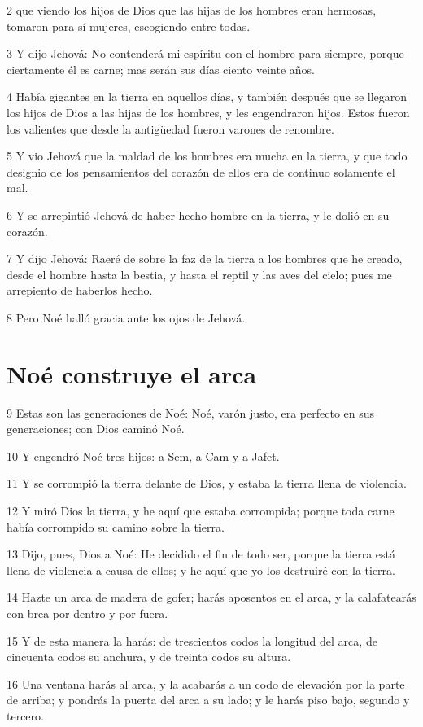2 que viendo los hijos de Dios que las hijas de los hombres eran hermosas, tomaron para sí mujeres, escogiendo entre todas.

3 Y dijo Jehová: No contenderá mi espíritu con el hombre para siempre, porque ciertamente él es carne; mas serán sus días ciento veinte años.

4 Había gigantes en la tierra en aquellos días, y también después que se llegaron los hijos de Dios a las hijas de los hombres, y les engendraron hijos. Estos fueron los valientes que desde la antigüedad fueron varones de renombre.

5 Y vio Jehová que la maldad de los hombres era mucha en la tierra, y que todo designio de los pensamientos del corazón de ellos era de continuo solamente el mal.

6 Y se arrepintió Jehová de haber hecho hombre en la tierra, y le dolió en su corazón.

7 Y dijo Jehová: Raeré de sobre la faz de la tierra a los hombres que he creado, desde el hombre hasta la bestia, y hasta el reptil y las aves del cielo; pues me arrepiento de haberlos hecho.

8 Pero Noé halló gracia ante los ojos de Jehová.

\section{Noé construye el arca}

9 Estas son las generaciones de Noé: Noé, varón justo, era perfecto en sus generaciones; con Dios caminó Noé.

10 Y engendró Noé tres hijos: a Sem, a Cam y a Jafet.

11 Y se corrompió la tierra delante de Dios, y estaba la tierra llena de violencia.

12 Y miró Dios la tierra, y he aquí que estaba corrompida; porque toda carne había corrompido su camino sobre la tierra.

13 Dijo, pues, Dios a Noé: He decidido el fin de todo ser, porque la tierra está llena de violencia a causa de ellos; y he aquí que yo los destruiré con la tierra.

14 Hazte un arca de madera de gofer; harás aposentos en el arca, y la calafatearás con brea por dentro y por fuera.

15 Y de esta manera la harás: de trescientos codos la longitud del arca, de cincuenta codos su anchura, y de treinta codos su altura.

16 Una ventana harás al arca, y la acabarás a un codo de elevación por la parte de arriba; y pondrás la puerta del arca a su lado; y le harás piso bajo, segundo y tercero.

